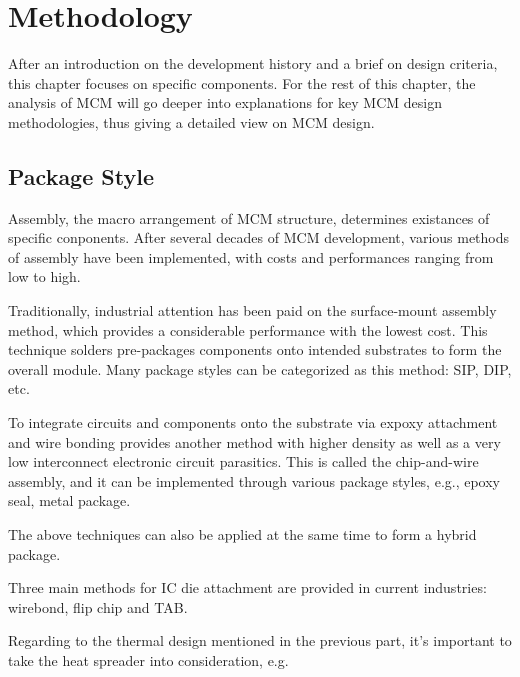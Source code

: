 
\chapter{Methodology}
\begin{spacing}{1.5}
\setlength{\parskip}{0.3in}

After an introduction on the development history and a brief on design criteria, this chapter focuses on specific components. For the rest of this chapter, the analysis of MCM will go deeper into explanations for key MCM design methodologies, thus giving a detailed view on MCM design. 

\section{Package Style}

Assembly, the macro arrangement of MCM structure, determines existances of specific conponents. After several decades of MCM development, various methods of assembly have been implemented, with costs and performances ranging from low to high. 

Traditionally, industrial attention has been paid on the surface-mount assembly method, which provides a considerable performance with the lowest cost. This technique solders pre-packages components onto intended substrates to form the overall module. Many package styles can be categorized as this method: SIP, DIP, etc. 

To integrate circuits and components onto the substrate via expoxy attachment and wire bonding provides another method with higher density as well as a very low interconnect electronic circuit parasitics. This is called the chip-and-wire assembly, and it can be implemented through various package styles, e.g., epoxy seal, metal package. 

The above techniques can also be applied at the same time to form a hybrid package. \cite{licari1998hybrid}

Three main methods for IC die attachment are provided in current industries: wirebond, flip chip and TAB. \cite{bogatin1997roadmaps} 


Regarding to the thermal design mentioned in the previous part, it's important to take the heat spreader into consideration, e.g.


\end{spacing}
